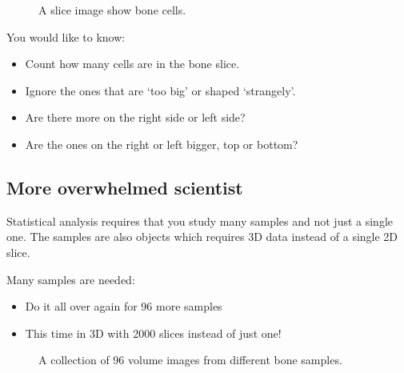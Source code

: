 \documentclass[letterpaper,10pt,english]{sphinxmanual}
\begin{document}
\begin{figure}[htbp]
\centering
\capstart

\noindent{}
\caption{A slice image show bone cells.}\label{\detokenize{01-Introduction:id11}}\end{figure}

\sphinxAtStartPar
You would like to know:
\begin{itemize}
\item {} 
\sphinxAtStartPar
Count how many cells are in the bone slice.

\item {} 
\sphinxAtStartPar
Ignore the ones that are ‘too big’ or shaped ‘strangely’.

\item {} 
\sphinxAtStartPar
Are there more on the right side or left side?

\item {} 
\sphinxAtStartPar
Are the ones on the right or left bigger, top or bottom?

\end{itemize}




\subsection{More overwhelmed scientist}
\label{\detokenize{01-Introduction:more-overwhelmed-scientist}}
\sphinxAtStartPar
Statistical analysis requires that you study many samples and not just a single one. The samples are also objects which requires 3D data instead of a single 2D slice.

\sphinxAtStartPar
Many samples are needed:
\begin{itemize}
\item {} 
\sphinxAtStartPar
Do it all over again for 96 more samples

\item {} 
\sphinxAtStartPar
This time in 3D with 2000 slices instead of just one!

\end{itemize}



\begin{figure}[htbp]
\centering
\capstart

\noindent{}
\caption{A collection of 96 volume images from different bone samples.}\label{\detokenize{01-Introduction:id12}}\end{figure}
\end{document}
